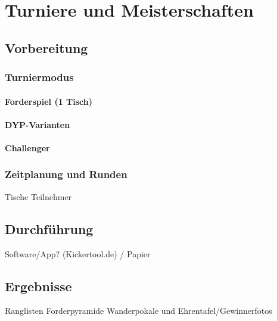\chapter{Turniere und Meisterschaften}
\label{turniere}

\section{Vorbereitung}


\subsection{Turniermodus}

\subsubsection{Forderspiel (1 Tisch)}

\subsubsection{DYP-Varianten}

\subsubsection{Challenger}

\subsection{Zeitplanung und Runden}
Tische Teilnehmer 

\section{Durchführung}
Software/App? (Kickertool.de) / Papier

\section{Ergebnisse}
Ranglisten
Forderpyramide
Wanderpokale und Ehrentafel/Gewinnerfotos

